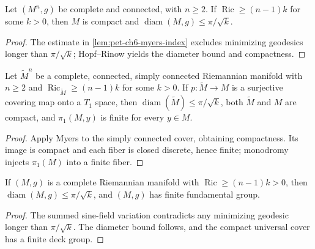 \begin{theorem}
  \label{thm:pet-ch6-myers-ricci-geometric}
  \leanok
  Let $(M^n,g)$ be complete and connected, with $n\ge2$. If
  $\operatorname{Ric}\ge(n-1)k$ for some $k>0$, then $M$ is compact and
  $\operatorname{diam}(M,g)\le\pi/\sqrt k$.
\end{theorem}
\begin{proof}
  \leanok
  \sketch
  The estimate in \cref{lem:pet-ch6-myers-index} excludes minimizing geodesics longer than \(\pi/\sqrt{k}\); Hopf--Rinow yields the diameter bound and compactness.
\end{proof}

\begin{theorem}
  \label{thm:pet-ch6-myers-explicit-cover}
  \leanok
  Let $\widetilde M^n$ be a complete, connected, simply connected Riemannian
  manifold with $n\ge2$ and $\operatorname{Ric}_{\widetilde M}\ge(n-1)k$ for
  some $k>0$. If $p:\widetilde M\to M$ is a surjective covering map onto a
  $T_1$ space, then
  $\operatorname{diam}(\widetilde M)\le\pi/\sqrt k$, both $\widetilde M$ and
  $M$ are compact, and $\pi_1(M,y)$ is finite for every $y\in M$.
\end{theorem}
\begin{proof}
  \leanok
  \sketch
  Apply Myers to the simply connected cover, obtaining compactness. Its image is compact and each fiber is closed discrete, hence finite; monodromy injects \(\pi_1(M)\) into a finite fiber.
\end{proof}

\begin{theorem}
  \label{thm:pet-ch6-myers-ricci-diameter}
  \notready
  \notready
  If $(M,g)$ is a complete Riemannian manifold with $\operatorname{Ric}\ge(n-1)k>0$,
  then $\operatorname{diam}(M,g)\le\pi/\sqrt k$, and $(M,g)$ has finite fundamental
  group.
\end{theorem}
\begin{proof}
  \sketch
  The summed sine-field variation contradicts any minimizing geodesic longer than \(\pi/\sqrt{k}\). The diameter bound follows, and the compact universal cover has a finite deck group.
\end{proof}

